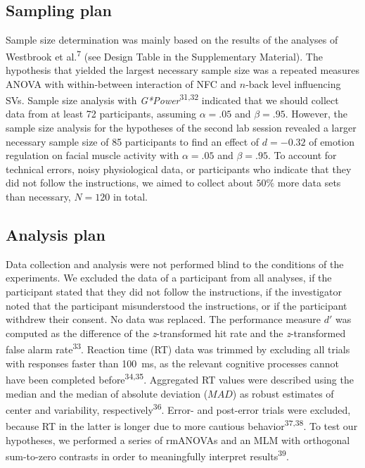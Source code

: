 \documentclass[
  man,floatsintext]{apa6}
\begin{document}
\hypertarget{sampling-plan}{%
\subsection{Sampling plan}\label{sampling-plan}}

Sample size determination was mainly based on the results of the analyses of Westbrook et al.\textsuperscript{7} (see Design Table in the Supplementary Material).
The hypothesis that yielded the largest necessary sample size was a repeated measures ANOVA with within-between interaction of NFC and \(n\)-back level influencing SVs.
Sample size analysis with \emph{G*Power}\textsuperscript{31,32} indicated that we should collect data from at least 72 participants, assuming \(\alpha=.05\) and \(\beta=.95\).
However, the sample size analysis for the hypotheses of the second lab session revealed a larger necessary sample size of 85 participants to find an effect of \(d=-0.32\) of emotion regulation on facial muscle activity with \(\alpha=.05\) and \(\beta=.95\).
To account for technical errors, noisy physiological data, or participants who indicate that they did not follow the instructions, we aimed to collect about \(50\%\) more data sets than necessary, \(N=120\) in total.

\hypertarget{analysis-plan}{%
\subsection{Analysis plan}\label{analysis-plan}}

Data collection and analysis were not performed blind to the conditions of the experiments.
We excluded the data of a participant from all analyses, if the participant stated that they did not follow the instructions, if the investigator noted that the participant misunderstood the instructions, or if the participant withdrew their consent.
No data was replaced.
The performance measure \(d'\) was computed as the difference of the \emph{z}-transformed hit rate and the \emph{z}-transformed false alarm rate\textsuperscript{33}.
Reaction time (RT) data was trimmed by excluding all trials with responses faster than 100~ms, as the relevant cognitive processes cannot have been completed before\textsuperscript{34,35}.
Aggregated RT values were described using the median and the median of absolute deviation (\(MAD\)) as robust estimates of center and variability, respectively\textsuperscript{36}.
Error- and post-error trials were excluded, because RT in the latter is longer due to more cautious behavior\textsuperscript{37,38}.
To test our hypotheses, we performed a series of rmANOVAs and an MLM with orthogonal sum-to-zero contrasts in order to meaningfully interpret results\textsuperscript{39}.
\end{document}
